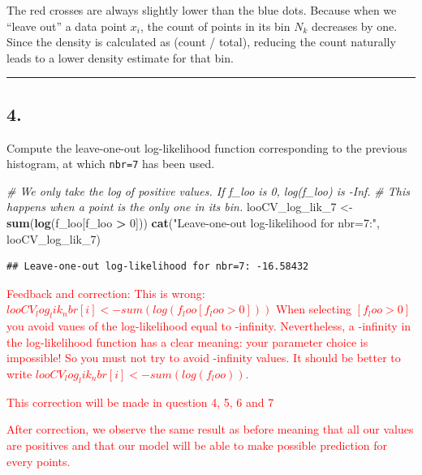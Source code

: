 \documentclass[
]{article}
\newenvironment{Shaded}{\begin{snugshade}}{\end{snugshade}}
\newcommand{\CommentTok}[1]{\textcolor[rgb]{0.56,0.35,0.01}{\textit{#1}}}
\newcommand{\DecValTok}[1]{\textcolor[rgb]{0.00,0.00,0.81}{#1}}
\newcommand{\FunctionTok}[1]{\textcolor[rgb]{0.13,0.29,0.53}{\textbf{#1}}}
\newcommand{\NormalTok}[1]{#1}
\newcommand{\OtherTok}[1]{\textcolor[rgb]{0.56,0.35,0.01}{#1}}
\newcommand{\SpecialCharTok}[1]{\textcolor[rgb]{0.81,0.36,0.00}{\textbf{#1}}}
\newcommand{\StringTok}[1]{\textcolor[rgb]{0.31,0.60,0.02}{#1}}
\begin{document}
The red crosses are always slightly lower than the blue dots. Because
when we ``leave out'' a data point \(x_i\), the count of points in its
bin \(N_k\) decreases by one. Since the density is calculated as (count
/ total), reducing the count naturally leads to a lower density estimate
for that bin.

\begin{center}\rule{0.5\linewidth}{0.5pt}\end{center}

\subsection{4.}\label{section-3}

Compute the leave-one-out log-likelihood function corresponding to the
previous histogram, at which \texttt{nbr=7} has been used.

\begin{Shaded}
\begin{Highlighting}[]
\CommentTok{\# We only take the log of positive values. If f\_loo is 0, log(f\_loo) is {-}Inf.}
\CommentTok{\# This happens when a point is the only one in its bin.}
\NormalTok{looCV\_log\_lik\_7 }\OtherTok{\textless{}{-}} \FunctionTok{sum}\NormalTok{(}\FunctionTok{log}\NormalTok{(f\_loo[f\_loo }\SpecialCharTok{\textgreater{}} \DecValTok{0}\NormalTok{]))}
\FunctionTok{cat}\NormalTok{(}\StringTok{"Leave{-}one{-}out log{-}likelihood for nbr=7:"}\NormalTok{, looCV\_log\_lik\_7)}
\end{Highlighting}
\end{Shaded}

\begin{verbatim}
## Leave-one-out log-likelihood for nbr=7: -16.58432
\end{verbatim}

\textcolor{red}{Feedback and correction: This is wrong: $looCV_log_lik_nbr[i] <- sum(log(f_loo[f_loo > 0]))$ When selecting $[f_loo > 0]$you avoid vaues of the log-likelihood equal to -infinity. Nevertheless, a -infinity in the log-likelihood function has a clear meaning: your parameter choice is impossible! So you must not try to avoid -infinity values. It should be better to write $looCV_log_lik_nbr[i] <- sum(log(f_loo))$.}

\textcolor{red}{This correction will be made in question 4, 5, 6 and 7}

\textcolor{red}{After correction, we observe the same result as before meaning that all our values are positives and that our model will be able to make possible prediction for every points.}
\end{document}
